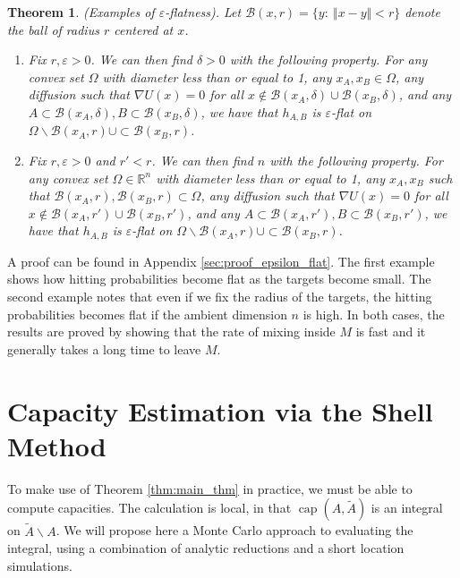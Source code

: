 \documentclass[12pt, nofootinbib,english, amsmath, amssymb, aps, priprint, graphicx,floatfix,draft]{revtex4-1}
\newtheorem{theorem}{Theorem}
\theoremstyle{plain}
\theoremstyle{definition}
\theoremstyle{plain}
\newcommand{\capac}[2]{\ensuremath{\operatorname{cap}}(#1,#2)}
\newcommand{\bb}[1]{\mathcal{B}\left(#1\right)}
\newcommand{\tA}{{\tilde A}}
\begin{document}
\begin{theorem}\label{thm:epsilon_flat} (Examples of $\varepsilon$-flatness).   Let $\bb{x,r} = \{y:\ \Vert x-y \Vert < r\}$ denote the ball of radius $r$ centered at $x$.
\begin{enumerate}
    \item Fix $r,\varepsilon>0$.  We can then find $\delta>0$ with the following property.  For any convex set $\Omega$ with diameter less than or equal to 1, any $x_A,x_B \in \Omega$, any diffusion such that $\nabla U(x) =0$ for all $x\notin \bb{x_A, \delta} \cup \bb{x_B, \delta}$, and any $A\subset \bb{x_A, \delta}, B \subset \bb{x_B, \delta}$, we have that $h_{A,B}$ is $\varepsilon$-flat on $\Omega \backslash \bb{x_A, r} \cup \subset \bb{x_B, r}$.

    \item Fix $r,\varepsilon>0$ and $r'<r$.  We can then find $n$ with the following property.  For any convex set $\Omega \in \mathbb{R}^n$ with diameter less than or equal to 1, any $x_A,x_B$ such that $\bb{x_A, r},\bb{x_B, r} \subset \Omega$, any diffusion such that $\nabla U(x) =0$ for all $x\notin \bb{x_A, r'} \cup \bb{x_B, r'}$, and any $A\subset \bb{x_A, r'}, B \subset \bb{x_B, r'}$, we have that $h_{A,B}$ is $\varepsilon$-flat on $\Omega \backslash \bb{x_A, r} \cup \subset \bb{x_B, r}$.
\end{enumerate}
\end{theorem}

A proof can be found in Appendix \ref{sec:proof_epsilon_flat}.  The first example shows how hitting probabilities become flat as the targets become small.  The second example notes that even if we fix the radius of the targets, the hitting probabilities becomes flat if the ambient dimension $n$ is high.  In both cases, the results are proved by showing that the rate of mixing inside $M$ is fast and it generally takes a long time to leave $M$.

                                                         


\section{Capacity Estimation via the Shell Method}
\label{sec:Estimation}
To make use of Theorem \ref{thm:main_thm} in practice, we must be able to compute capacities.  The calculation is local, in that $\capac{A}{\tilde{A}}$ is an integral on $\tA\backslash A$. We will propose here a Monte Carlo approach to evaluating the integral, using a combination of analytic reductions and a short location simulations.
\end{document}
